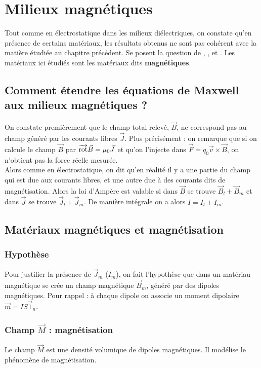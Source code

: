 \documentclass[12pt]{book}
\begin{document}
\chapter{Milieux magnétiques}
Tout comme en électrostatique dans les milieux diélectriques, on constate qu'en présence de certains matériaux, les résultats obtenus ne sont pas cohérent avec la matière étudiée au chapitre précédent. Se posent la question de , , et . Les matériaux ici étudiés sont les matériaux dits \textbf{magnétiques}.
\section{Comment étendre les équations de Maxwell aux milieux magnétiques ?}
On constate premièrement que le champ total relevé, $\vec{B}$, ne correspond pas au champ généré par les courants libres $\vec{J}$. Plus précisément : on remarque que si on calcule le champ $\vec{B}$ par $\overrightarrow{\text{rot}} \vec{B} = \mu_0 \vec{J}$ et qu'on l'injecte dans $\vec{F} = q_0\vec{v}\times\vec{B}$, on n'obtient pas la force réelle mesurée. \\

Alors comme en électrostatique, on dit qu'en réalité il y a une partie du champ qui est due aux courants libres, et une autre due à des courants dits de magnétisation. Alors la loi d'Ampère est valable si dans $\vec{B}$ se trouve $\vec{B}_l + \vec{B}_m$ et dans  $\vec{J}$ se trouve $\vec{J}_l + \vec{J}_m$. De manière intégrale on a alors $I = I_l + I_m$.

\section{Matériaux magnétiques et magnétisation}
\subsection{Hypothèse}
Pour justifier la présence de $\vec{J}_m$ ($I_m$), on fait l'hypothèse que dans un matériau magnétique se crée un champ magnétique $\vec{B}_m$, généré par des dipoles magnétiques. Pour  rappel : à chaque dipole on associe un moment dipolaire $\vec{m} = IS \vec{1}_n$.

\subsection{Champ $\vec{M}$ : magnétisation}
Le champ $\vec{M}$ est une densité volumique de dipoles magnétiques. Il modélise le phénomène de magnétisation.
\end{document}
